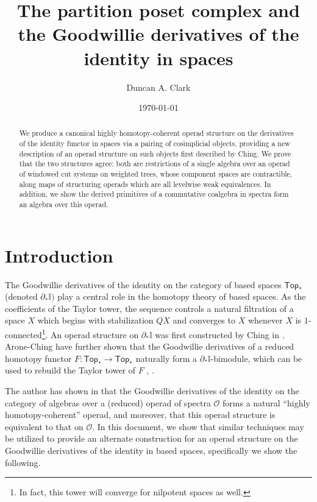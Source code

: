 \documentclass[12pt]{amsart}
\title[Derivatives of identity in spaces]{The partition poset complex and the Goodwillie derivatives of the identity in spaces}
\author{Duncan A. Clark}
\theoremstyle{definition}
\theoremstyle{remark}
\newcommand{\Top}{\mathsf{Top}_*}
\newcommand{\Id}{\mathbb{I}}
\newcommand{\Cal}[1]{\mathcal{#1}}
\begin{document}
\date{\today}
\maketitle

\begin{abstract}
    We produce a canonical highly homotopy-coherent operad structure on the derivatives of the identity functor in spaces via a pairing of cosimplicial objects, providing a new description of an operad structure on such objects first described by Ching. We prove that the two structures agree: both are restrictions of a single algebra over an operad of windowed cut systems on weighted trees, whose component spaces are contractible, along maps of structuring operads which are all levelwise weak equivalences. In addition, we show the derived primitives of a commutative coalgebra in spectra form an algebra over this operad.
\end{abstract}

\section{Introduction}
The Goodwillie derivatives of the identity on the category of based spaces $\Top$ (denoted $\partial_* \Id)$ play a central role in the homotopy theory of based spaces. As the coefficients of the Taylor tower, the sequence controls a natural filtration of a space $X$ which begins with stabilization $QX$ and converges to $X$ whenever $X$ is $1$-connected\footnote{In fact, this tower will converge for nilpotent spaces as well.}. An operad structure on $\partial_* \Id$ was first constructed by Ching in \cite{Ching-thesis}. Arone-Ching \cite{AC-1} have further shown that the Goodwillie derivatives of a reduced homotopy functor $F\colon \Top \to \Top$ naturally form a $\partial_*\Id$-bimodule, which can be used to rebuild the Taylor tower of $F$ \cite{AC-coalg}, \cite{AC-2}.

The author has shown in \cite{Clark-1} that the Goodwillie derivatives of the identity on the category of algebras over a (reduced) operad of spectra $\Cal{O}$ forms a natural ``highly homotopy-coherent'' operad, and moreover, that this operad structure is equivalent to that on $\Cal{O}$. In this document, we show that similar techniques may be utilized to provide an alternate construction for an operad structure on the Goodwillie derivatives of the identity in based spaces, specifically we show the following.
\end{document}
